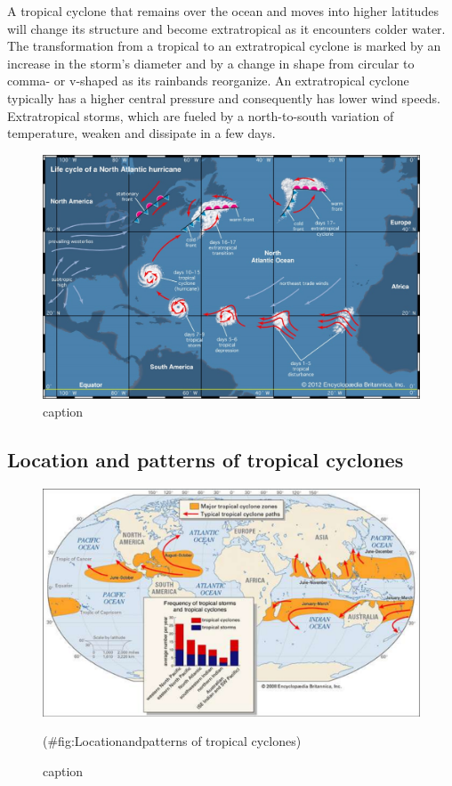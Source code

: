 \documentclass[12pt,oneside]{book}
\begin{document}
A tropical cyclone that remains over the ocean and moves into higher
latitudes will change its structure and become extratropical as it
encounters colder water. The transformation from a tropical to an
extratropical cyclone is marked by an increase in the storm's diameter
and by a change in shape from circular to comma- or v-shaped as its
rainbands reorganize. An extratropical cyclone typically has a higher
central pressure and consequently has lower wind speeds. Extratropical
storms, which are fueled by a north-to-south variation of temperature,
weaken and dissipate in a few days.

\begin{figure}

{\centering \includegraphics[width=0.8\linewidth]{figures/FigureE14} 

}

\caption{caption}\label{fig:Stagesofdevelopment}
\end{figure}

\subsection{Location and patterns of tropical
cyclones}\label{location-and-patterns-of-tropical-cyclones}

\begin{figure}

{\centering \includegraphics[width=0.8\linewidth]{figures/FigureE15} 

}

\caption{caption}(\#fig:Locationandpatterns of tropical cyclones)
\end{figure}
\end{document}
